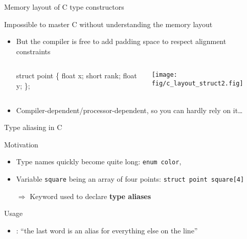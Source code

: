 \begin{Coupe}
\begin{frame}[fragile]{Memory layout of C type constructors}
\begin{block}{Impossible to master C without understanding the memory layout}
    \begin{itemize}
    \item But the compiler is free to add \alert{padding space} to respect alignment constraints
    \begin{columns}
      \begin{column}{.3\linewidth}
        \begin{boitecode}{}
struct point \{
  float x;
  short rank;                  
  float y;    
\};
        \end{boitecode}
      \end{column}
      \begin{column}{.6\linewidth}
        \texttt{[image: fig/c\_layout\_struct2.fig]}
      \end{column}
    \end{columns}
  \item Compiler-dependent/processor-dependent, so you can hardly rely on it\ldots
    \end{itemize}
  \end{block}
\end{frame}
\begin{frame}{Type aliasing in C}
  \begin{block}{Motivation}\vspace{-.3\baselineskip}
    \begin{itemize}
    \item Type names quickly become quite long: \texttt{enum color},
    \item Variable \texttt{square} being an array of four points:
      \texttt{struct point square[4]}
    \item[$\Rightarrow$] Keyword  used to declare
      \textbf{type aliases}
    \end{itemize}
  \end{block}\vspace{-\baselineskip}
  \begin{block}{Usage}\vspace{-.3\baselineskip}
    \begin{itemize}
    \item {}: ``the last word is an alias for
      everything else on the line''
    \end{itemize}
  \begin{columns}
    \begin{column}{.45\linewidth}

\end{column}
\end{columns}
\end{block}
\end{frame}
\end{Coupe}
